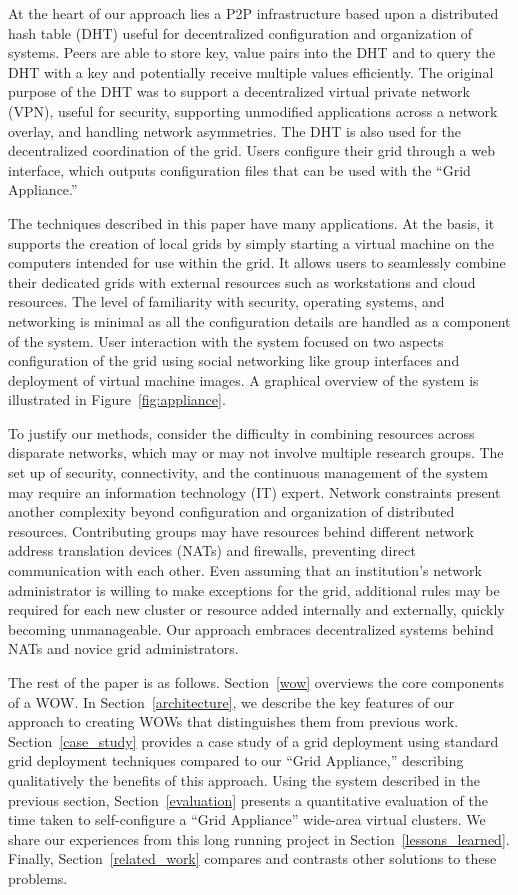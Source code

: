 \documentclass[conference]{IEEEtran}
\begin{document}
At the heart of our approach lies a P2P infrastructure based upon a distributed
hash table (DHT) useful for decentralized configuration and organization of
systems.  Peers are able to store key, value pairs into the DHT and to query
the DHT with a key and potentially receive multiple values efficiently.  The
original purpose of the DHT was to support a decentralized virtual private
network (VPN), useful for security, supporting unmodified applications across a
network overlay, and handling network asymmetries.  The DHT is also used for
the decentralized coordination of the grid.  Users configure their grid through
a web interface, which outputs configuration files that can be used with the
``Grid Appliance.''

The techniques described in this paper have many applications.  At the basis,
it supports the creation of local grids by simply starting a virtual machine on
the computers intended for use within the grid.  It allows users to seamlessly
combine their dedicated grids with external resources such as workstations and
cloud resources.  The level of familiarity with security, operating systems,
and networking is minimal as all the configuration details are handled as a
component of the system.  User interaction with the system focused on two
aspects configuration of the grid using social networking like group interfaces
and deployment of virtual machine images.  A graphical overview of the system
is illustrated in Figure~\ref{fig:appliance}.

To justify our methods, consider the difficulty in combining resources across
disparate networks, which may or may not involve multiple research groups.  The
set up of security, connectivity, and the continuous management of the system
may require an information technology (IT) expert.  Network constraints present
another complexity beyond configuration and organization of distributed
resources.  Contributing groups may have resources behind different network
address translation devices (NATs) and firewalls, preventing direct
communication with each other.  Even assuming that an institution's network
administrator is willing to make exceptions for the grid, additional rules may
be required for each new cluster or resource added internally and externally,
quickly becoming unmanageable.  Our approach embraces decentralized systems
behind NATs and novice grid administrators.

The rest of the paper is as follows.  Section~\ref{wow} overviews the core
components of a WOW.  In Section~\ref{architecture}, we describe the key
features of our approach to creating WOWs that distinguishes them from previous
work.  Section~\ref{case_study} provides a case study of a grid deployment
using standard grid deployment techniques compared to our ``Grid Appliance,''
describing qualitatively  the benefits of this approach.  Using the system
described in the previous section, Section~\ref{evaluation} presents a
quantitative evaluation of the time taken to self-configure a ``Grid
Appliance'' wide-area virtual clusters.  We share our experiences from this
long running project in Section~\ref{lessons_learned}.  Finally,
Section~\ref{related_work} compares and contrasts other solutions to these
problems.
\end{document}
